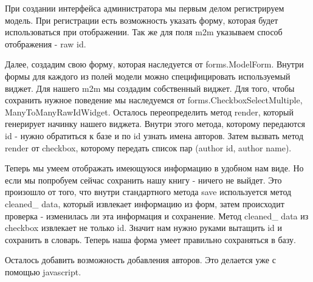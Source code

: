 \documentclass[a4paper]{report}
\begin{document}
При создании интерфейса администратора мы первым делом регистрируем модель. При 
регистрации есть возможность указать форму, которая будет использоваться при
отображении. Так же для поля m2m указываем способ отображения - raw id.

Далее, создадим свою форму, которая наследуется от forms.ModelForm.
Внутри формы для каждого из полей модели можно специфицировать используемый 
виджет. Для нашего m2m мы создадим собственный виджет. Для того, чтобы сохранить 
нужное поведение мы наследуемся от forms.CheckboxSelectMultiple, 
ManyToManyRawIdWidget. Осталось переопределить метод render, который генерирует 
начинку нашего виджета. Внутри этого метода, которому передаются id - нужно
обратиться к  базе и по id узнать имена авторов. Затем вызвать метод render
от checkbox, которому передать список пар (author id, author name).

Теперь мы умеем отображать имеющуюся информацию в удобном нам виде. Но если мы 
попробуем сейчас сохранить нашу книгу - ничего не выйдет. Это произошло от того, 
что внутри стандартного метода save используется метод cleaned\_ data, который 
извлекает информацию из форм, затем происходит проверка - изменилась ли эта 
информация и сохранение. Метод cleaned\_ data из checkbox извлекает не только id.
Значит нам нужно руками вытащить id и сохранить в словарь. Теперь наша форма
умеет правильно сохраняться в базу.

Осталось добавить возможность добавления авторов. Это делается уже с помощью 
javascript. 

 
\end{document}
